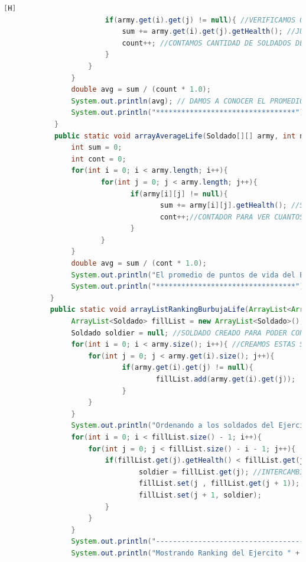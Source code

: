 \documentclass{article}
\begin{document}
\begin{lstlisting}[language=java,caption={Las lineas de codigos del metodo creado:}][H]
						if(army.get(i).get(j) != null){ //VERIFICAMOS QUE EL SOLDADO DE CADA CASILLA SEA NO NULO 
							sum += army.get(i).get(j).getHealth(); //JUNTAMOS LOS VALORES DE VIDA DE CADA SOLDADO DE CADA EJERCITO 
							count++; //CONTAMOS CANTIDAD DE SOLDADOS DE CADA EJERCITO PARA DESPUES PODER DIVIDIRLO CON LA SUMA DE VIDA DE CADA EJERCITO
						}
					}
				}
				double avg = sum / (count * 1.0);
				System.out.println(avg); // DAMOS A CONOCER EL PROMEDIO DE VIDA DE CADA EJERCITO 
				System.out.println("*********************************");
			}
			public static void arrayAverageLife(Soldado[][] army, int num){
				int sum = 0;
				int cont = 0;
				for(int i = 0; i < army.length; i++){
					   for(int j = 0; j < army.length; j++){
							  if(army[i][j] != null){
									 sum += army[i][j].getHealth(); //SUMAMOS LA VIDA DE LOS SOLDADOS DEL EJERCITO 2 
									 cont++;//CONTADOR PARA VER CUANTOS SOLDADOS EXISTEN EN ESTE EJERCITO PARA DESPUES PODER DIVIDIRLO CON SU SUMA
							  }
					   }
				}
				double avg = sum / (cont * 1.0);
				System.out.println("El promedio de puntos de vida del Ejercito " + num + " es: " + "\n" + avg);
				System.out.println("*********************************"); // AGREGANDOLO PARA HACER EL SIGUIENTE METODO Y SEPARARLOS
		   }
		   public static void arrayListRankingBurbujaLife(ArrayList<ArrayList<Soldado>> army, int num){
				ArrayList<Soldado> fillList = new ArrayList<Soldado>(); //CREAMOS ESTE ARRAYLIST PARA PODER GUARDAR A LOS SOLDADOS EN UN SOLO ARRAYLIST EL CUAL SEA EFECTIVO EL METODO BURBUJA 
				Soldado soldier = null; //SOLDADO CREADO PARA PODER CONTENER EL INTERCAMBIO ENTRE SOLDADOS EN EL METODO BURBUJA
				for(int i = 0; i < army.size(); i++){ //CREAMOS ESTAS SENTENCIAS PARA PODER VERIFICAR EL NUMERO DE SOLDADOS PARA DESPUES PONER EL RANKING DE PUESTOS DE CADA UNO DE ESTOS SOLDADOS
					for(int j = 0; j < army.get(i).size(); j++){
							if(army.get(i).get(j) != null){
									fillList.add(army.get(i).get(j));
							}
					}
				}
				System.out.println("Ordenando a los soldados del Ejercito " + num + " por el metodo burbuja: "); //APLICAMOS EL METODO BURBUJA CON LOS PUNTOS DE VIDA
				for(int i = 0; i < fillList.size() - 1; i++){
					for(int j = 0; j < fillList.size() - i - 1; j++){
						if(fillList.get(j).getHealth() < fillList.get(j + 1).getHealth()){
								soldier = fillList.get(j); //INTERCAMBIO
								fillList.set(j , fillList.get(j + 1));
								fillList.set(j + 1, soldier);
						}
					}      
				}
				System.out.println("------------------------------------------");
				System.out.println("Mostrando Ranking del Ejercito " + num + " ..... ////// --->"); //MOSTRADOR DE RANKING DE LOS SOLDADOS

\end{lstlisting}
\end{document}
